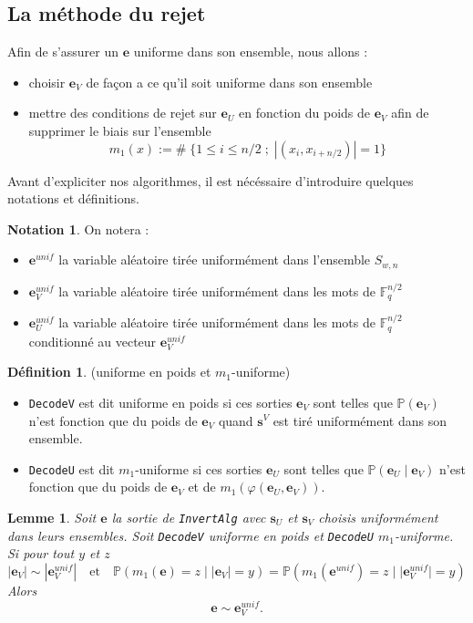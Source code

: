 \documentclass[12pt]{article}
\theoremstyle{plain}
\newtheorem{lemme}[thm]{Lemme}
\theoremstyle{definition}
\newtheorem{defi}[thm]{Définition}
\newtheorem{nota}[thm]{Notation}
\newcommand{\F}{\mathbb{F}}
\newcommand{\e}{\mathbf{e}}
\begin{document}
\subsection{La méthode du rejet}
Afin de s'assurer un $\mathbf{e}$ uniforme dans son ensemble, nous allons :
\begin{itemize}
\item choisir $\mathbf{e}_V$ de façon a ce qu'il soit uniforme dans son ensemble 
\item mettre des conditions de rejet sur $\mathbf{e}_U$ en fonction du poids de $\mathbf{e}_V$ afin de supprimer le biais sur l'ensemble 
$$ m_1(x) := \# \; \{1  \leq i \leq n/2 \;;\; |(x_i, x_{i+n/2})| = 1\}$$
\end{itemize}
Avant d'expliciter nos algorithmes, il est nécéssaire d'introduire quelques notations et définitions. \\

\begin{nota} On notera :
\begin{itemize}
\item $\mathbf{e}^{unif}$ la variable aléatoire tirée uniformément dans l'ensemble $S_{w,n}$
\item $\mathbf{e}_V^{unif}$ la variable aléatoire tirée uniformément dans les mots de $\F_q^{n/2}$ 
\item $\mathbf{e}_U^{unif}$ la variable aléatoire tirée uniformément dans les mots de $\F_q^{n/2}$ conditionné au vecteur $\e_V^{unif}$
\end{itemize}
\end{nota}


\begin{defi} (uniforme en poids et $m_1$-uniforme)
\begin{itemize}
\item \verb|DecodeV| est dit uniforme en poids si ces sorties $\mathbf{e}_V$ sont telles que $\mathbb{P}(\mathbf{e}_V)$ n'est fonction que du poids de $\mathbf{e}_V$ quand $\mathbf{s}^V$ est tiré uniformément dans son ensemble.
\item \verb|DecodeU| est dit $m_1$-uniforme si ces sorties $\mathbf{e}_U$ sont telles que $\mathbb{P}(\mathbf{e}_U\; |\;  \mathbf{e}_V)$ n'est fonction que du poids de $\mathbf{e}_V$ et de $m_1(\varphi(\mathbf{e}_U,\mathbf{e}_V))$.
\end{itemize}
\end{defi}

\begin{lemme} Soit $\mathbf{e}$ la sortie de \verb|InvertAlg| avec $\mathbf{s}_U$ et $\mathbf{s}_V$ choisis uniformément dans leurs ensembles. Soit \verb|DecodeV| uniforme en poids et \verb|DecodeU| $m_1$-uniforme. Si pour tout $y$ et $z$ 
$$|\mathbf{e}_V| \sim |\mathbf{e}_V^{unif}|\quad \text{et} \quad\mathbb{P}(m_1(\mathbf{e}) = z\; |\; |\mathbf{e}_V| = y) = \mathbb{P}(m_1(\mathbf{e}^{unif}) = z\; |\; |\mathbf{e}_V^{unif}| = y)$$
Alors
$$ \mathbf{e} \sim \mathbf{e}_V^{unif}.$$
\end{lemme}
\end{document}
